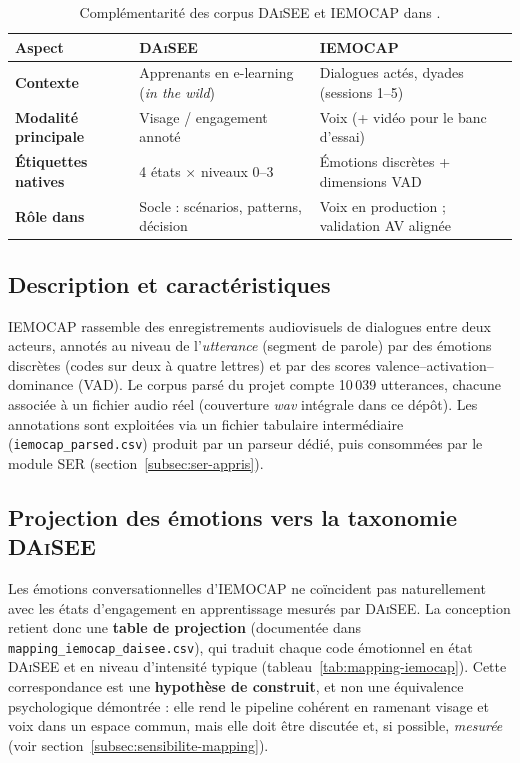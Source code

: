 \begin{table}[H]
\centering
\renewcommand{\arraystretch}{1.2}
\begin{tabular}{>{\bfseries}l p{5.2cm} p{5.2cm}}
\toprule
Aspect & \textsc{DAiSEE} & \textsc{IEMOCAP} \\
\midrule
Contexte & Apprenants en e-learning (\emph{in the wild}) &
Dialogues actés, dyades (sessions 1--5) \\
Modalité principale & Visage / engagement annoté &
Voix (+ vidéo pour le banc d'essai) \\
Étiquettes natives & 4 états $\times$ niveaux 0--3 &
Émotions discrètes + dimensions VAD \\
Rôle dans \emolearn{} &
Socle : scénarios, patterns, décision &
Voix en production ; validation AV alignée \\
\bottomrule
\end{tabular}
\caption{Complémentarité des corpus \textsc{DAiSEE} et \textsc{IEMOCAP} dans
\emolearn{}.}
\label{tab:complementarite-corpus}
\end{table}

\subsection{Description et caractéristiques}

\textsc{IEMOCAP} rassemble des enregistrements audiovisuels de dialogues entre
deux acteurs, annotés au niveau de l'\emph{utterance} (segment de parole) par des
émotions discrètes (codes sur deux à quatre lettres) et par des scores
valence--activation--dominance (VAD). Le corpus parsé du projet compte 10\,039 utterances, chacune associée à un fichier audio réel
(couverture \emph{wav} intégrale dans ce dépôt). Les annotations sont exploitées
via un fichier tabulaire intermédiaire (\texttt{iemocap\_parsed.csv}) produit par
un parseur dédié, puis consommées par le module SER (section~\ref{subsec:ser-appris}).

\subsection{Projection des émotions vers la taxonomie \textsc{DAiSEE}}
\label{subsec:mapping-iemocap}

Les émotions conversationnelles d'\textsc{IEMOCAP} ne coïncident pas
naturellement avec les états d'engagement en apprentissage mesurés par
\textsc{DAiSEE}. La conception retient donc une \textbf{table de projection}
(documentée dans \texttt{mapping\_iemocap\_daisee.csv}), qui traduit chaque code
émotionnel en état \textsc{DAiSEE} et en niveau d'intensité typique
(tableau~\ref{tab:mapping-iemocap}). Cette correspondance est une
\textbf{hypothèse de construit}, et non une équivalence psychologique démontrée :
elle rend le pipeline cohérent en ramenant visage et voix dans un espace commun,
mais elle doit être discutée et, si possible, \emph{mesurée} (voir
section~\ref{subsec:sensibilite-mapping}).

